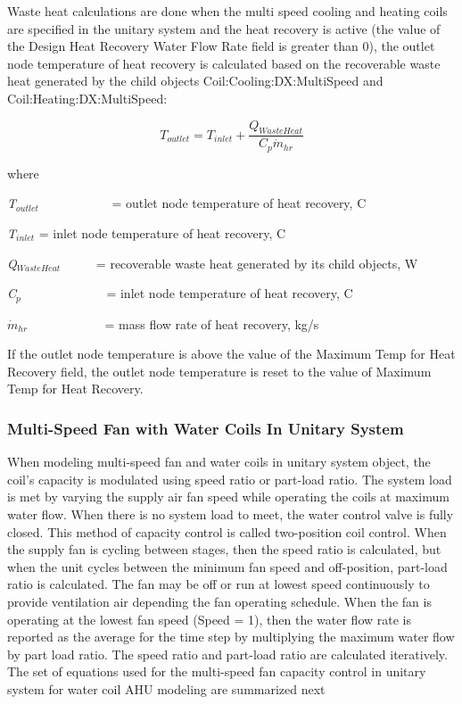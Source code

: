 Waste heat calculations are done when the multi speed cooling and heating coils are specified in the unitary system and the heat recovery is active (the value of the Design Heat Recovery Water Flow Rate field is greater than 0), the outlet node temperature of heat recovery is calculated based on the recoverable waste heat generated by the child objects Coil:Cooling:DX:MultiSpeed and Coil:Heating:DX:MultiSpeed:

\begin{equation}
{T_{outlet}} = {T_{inlet}} + \frac{{{Q_{WasteHeat}}}}{{{C_p}{{\dot m}_{hr}}}}
\end{equation}

where

\emph{T\(_{outlet}\)}~~~~~~~~~~~ = outlet node temperature of heat recovery, C

\emph{T\(_{inlet}\)} = inlet node temperature of heat recovery, C

\emph{Q\(_{WasteHeat}\)}~~~~~ = recoverable waste heat generated by its child objects, W

\emph{C\(_{p}\)}~~~~~~~~~~~~~ = inlet node temperature of heat recovery, C

\({\dot m_{hr}}\) ~~~~~~~~~~~ = mass flow rate of heat recovery, kg/s

If the outlet node temperature is above the value of the Maximum Temp for Heat Recovery field, the outlet node temperature is reset to the value of Maximum Temp for Heat Recovery.

\subsubsection{Multi-Speed Fan with Water Coils In Unitary System}\label{multi-speed-fan-with-water-coils-in-unitary-system}

When modeling multi-speed fan and water coils in unitary system object, the coil's capacity is modulated using speed ratio or part-load ratio. The system load is met by varying the supply air fan speed while operating the coils at maximum water flow. When there is no system load to meet, the water control valve is fully closed. This method of capacity control is called two-position coil control. When the supply fan is cycling between stages, then the speed ratio is calculated, but when the unit cycles between the minimum fan speed and off-position, part-load ratio is calculated. The fan may be off or run at lowest speed continuously to provide ventilation air depending the fan operating schedule. When the fan is operating at the lowest fan speed (Speed = 1), then the water flow rate is reported as the average for the time step by multiplying the maximum water flow by part load ratio. The speed ratio and part-load ratio are calculated iteratively. The set of equations used for the multi-speed fan capacity control in unitary system for water coil AHU modeling are summarized next

